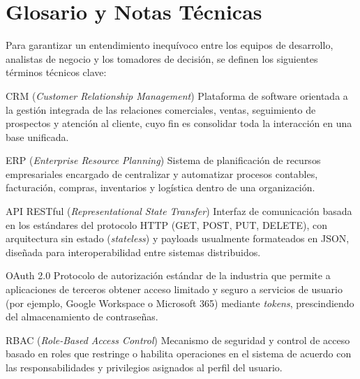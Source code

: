 \documentclass[11pt,a4paper]{article}
\begin{document}
\vspace{0.5cm}

\section{Glosario y Notas Técnicas}

Para garantizar un entendimiento inequívoco entre los equipos de desarrollo, analistas de negocio y los tomadores de decisión, se definen los siguientes términos técnicos clave:

\begin{GlossaryBox}{CRM (\textit{Customer Relationship Management})}
    Plataforma de software orientada a la gestión integrada de las relaciones comerciales, ventas, seguimiento de prospectos y atención al cliente, cuyo fin es consolidar toda la interacción en una base unificada.
\end{GlossaryBox}

\begin{GlossaryBox}{ERP (\textit{Enterprise Resource Planning})}
    Sistema de planificación de recursos empresariales encargado de centralizar y automatizar procesos contables, facturación, compras, inventarios y logística dentro de una organización.
\end{GlossaryBox}

\begin{GlossaryBox}{API RESTful (\textit{Representational State Transfer})}
    Interfaz de comunicación basada en los estándares del protocolo HTTP (GET, POST, PUT, DELETE), con arquitectura sin estado (\textit{stateless}) y payloads usualmente formateados en JSON, diseñada para interoperabilidad entre sistemas distribuidos.
\end{GlossaryBox}

\begin{GlossaryBox}{OAuth 2.0}
    Protocolo de autorización estándar de la industria que permite a aplicaciones de terceros obtener acceso limitado y seguro a servicios de usuario (por ejemplo, Google Workspace o Microsoft 365) mediante \textit{tokens}, prescindiendo del almacenamiento de contraseñas.
\end{GlossaryBox}

\begin{GlossaryBox}{RBAC (\textit{Role-Based Access Control})}
    Mecanismo de seguridad y control de acceso basado en roles que restringe o habilita operaciones en el sistema de acuerdo con las responsabilidades y privilegios asignados al perfil del usuario.
\end{GlossaryBox}
\end{document}
